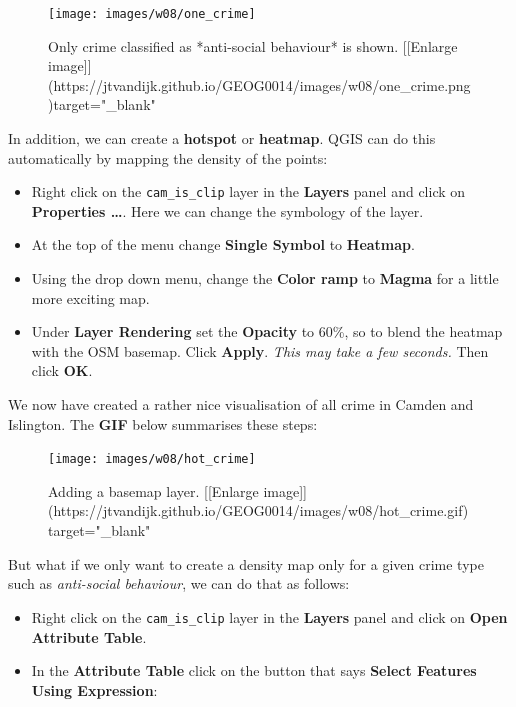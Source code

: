 \documentclass[
]{book}
\providecommand{\tightlist}{%
  \setlength{\itemsep}{0pt}\setlength{\parskip}{0pt}}
\begin{document}
\begin{figure}

{\centering \texttt{[image: images/w08/one\_crime]} 

}

\caption{Only crime classified as *anti-social behaviour* is shown. [[Enlarge image]](https://jtvandijk.github.io/GEOG0014/images/w08/one_crime.png){target="_blank"}}\label{fig:one-crime}
\end{figure}

In addition, we can create a \textbf{hotspot} or \textbf{heatmap}. QGIS can do this automatically by mapping the density of the points:

\begin{itemize}
\tightlist
\item
  Right click on the \texttt{cam\_is\_clip} layer in the \textbf{Layers} panel and click on \textbf{Properties \ldots{}}. Here we can change the symbology of the layer.
\item
  At the top of the menu change \textbf{Single Symbol} to \textbf{Heatmap}.
\item
  Using the drop down menu, change the \textbf{Color ramp} to \textbf{Magma} for a little more exciting map.
\item
  Under \textbf{Layer Rendering} set the \textbf{Opacity} to 60\%, so to blend the heatmap with the OSM basemap. Click \textbf{Apply}. \emph{This may take a few seconds.} Then click \textbf{OK}.
\end{itemize}

We now have created a rather nice visualisation of all crime in Camden and Islington. The \textbf{GIF} below summarises these steps:

\begin{figure}

{\centering \texttt{[image: images/w08/hot\_crime]} 

}

\caption{Adding a basemap layer. [[Enlarge image]](https://jtvandijk.github.io/GEOG0014/images/w08/hot_crime.gif){target="_blank"}}\label{fig:hot-crime}
\end{figure}

But what if we only want to create a density map only for a given crime type such as \emph{anti-social behaviour}, we can do that as follows:

\begin{itemize}
\tightlist
\item
  Right click on the \texttt{cam\_is\_clip} layer in the \textbf{Layers} panel and click on \textbf{Open Attribute Table}.
\item
  In the \textbf{Attribute Table} click on the button that says \textbf{Select Features Using Expression}:
\end{itemize}
\end{document}
